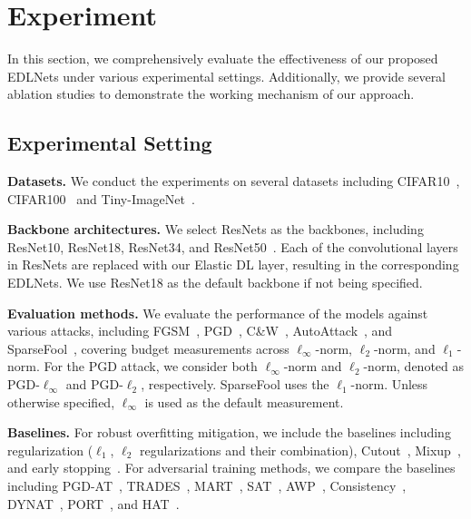 




\section{Experiment}

In this section, we comprehensively evaluate the effectiveness of our proposed 
EDLNets under various experimental settings. Additionally, we provide several ablation studies to demonstrate the working mechanism of our approach. 





\subsection{Experimental Setting}

\textbf{Datasets.} We conduct the experiments on several datasets including CIFAR10~\citep{krizhevsky2009learning}, CIFAR100~\citep{krizhevsky2009learning} and Tiny-ImageNet~\citep{le2015tiny}.




\textbf{Backbone architectures.} We select ResNets as the backbones, including ResNet10, ResNet18, ResNet34, and ResNet50~\citep{he2016deep}. Each of the convolutional layers in ResNets are replaced with our Elastic DL layer, resulting in the corresponding EDLNets.
We use ResNet18 as the default backbone if not being specified.

\textbf{Evaluation methods.} 
We evaluate the performance of the models against various attacks, including FGSM~\citep{goodfellow2014explaining}, PGD~\citep{madry2017towards}, C\&W~\citep{carlini2017towards}, AutoAttack~\citep{croce2020reliable}, and SparseFool~\cite{modas2019sparsefool}, covering budget measurements across $\ell_\infty$-norm, $\ell_2$-norm, and $\ell_1$-norm.
For the PGD attack, we consider both $\ell_\infty$-norm and $\ell_2$-norm, denoted as PGD-$\ell_\infty$ and PGD-$\ell_2$, respectively. SparseFool uses the $\ell_1$-norm. Unless otherwise specified, $\ell_\infty$ is used as the default measurement.


\textbf{Baselines.} For robust overfitting mitigation, we include the baselines including regularization ($\ell_1$, $\ell_2$ regularizations and their combination), Cutout~\cite{devries2017improved}, Mixup~\cite{zhang2017mixup}, and early stopping~\cite{rice2020overfitting}. For adversarial training methods, we compare the baselines including PGD-AT~\citep{madry2017towards}, TRADES~\citep{zhang2019theoretically}, MART~\citep{wang2019improving}, SAT~\citep{huang2020self},  AWP~\citep{wu2020adversarial}, Consistency~\citep{tack2022consistency}, DYNAT~\cite{liu2024dynamic}, PORT~\cite{sehwag2021robust}, and HAT~\cite{rade2022reducing}. 


